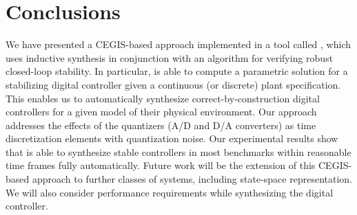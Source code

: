 \documentclass{sig-alternate-05-2015}
\begin{document}

\section{Conclusions} \label{sec:conclusions}

We have presented a CEGIS-based approach implemented in a tool called \tool, 
which uses inductive synthesis in conjunction with an algorithm for verifying 
robust closed-loop stability. In particular, \tool is able to compute a parametric solution 
for a stabilizing digital controller given a continuous (or discrete) plant 
specification.  This enables us to automatically synthesize correct-by-construction 
digital controllers for a given model of their physical environment.  
Our approach addresses the effects of the quantizers (A/D and D/A converters) 
as time discretization elements with quantization noise.  Our experimental results 
show that \tool is able to synthesize stable controllers in most benchmarks within
reasonable time frames fully automatically.
%
%
Future work will be the extension of this CEGIS-based approach to further
classes of systems, including state-space representation.  
We will also consider performance requirements while
synthesizing the digital controller.


  

\end{document}
